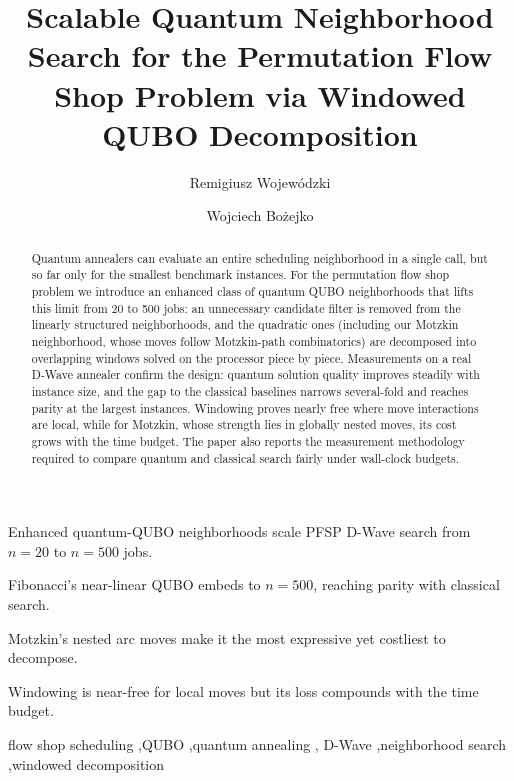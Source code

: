 \documentclass[preprint,12pt,authoryear]{elsarticle}
\begin{document}
\begin{frontmatter}

\title{Scalable Quantum Neighborhood Search for the Permutation Flow Shop
       Problem via Windowed QUBO Decomposition}

\author[pwr]{Remigiusz Wojew\'{o}dzki}

\author[pwr]{Wojciech Bo\.{z}ejko}



\begin{abstract}
Quantum annealers can evaluate an entire scheduling neighborhood in a
single call, but so far only for the smallest benchmark instances. For
the permutation flow shop problem we introduce an enhanced class of
quantum QUBO neighborhoods that lifts this limit from 20 to 500 jobs:
an unnecessary candidate filter is removed from the linearly
structured neighborhoods, and the quadratic ones (including our
Motzkin neighborhood, whose moves follow Motzkin-path combinatorics)
are decomposed into overlapping windows solved on the processor
piece by piece. Measurements on a real D-Wave annealer confirm the
design: quantum solution quality improves steadily with instance size,
and the gap to the classical baselines narrows several-fold and
reaches parity at the largest instances. Windowing proves nearly free
where move interactions are local, while for Motzkin, whose strength
lies in globally nested moves, its cost grows with the time budget. The
paper also reports the measurement methodology required to compare
quantum and classical search fairly under wall-clock budgets.
\end{abstract}

\begin{highlights}
  \item Enhanced quantum-QUBO neighborhoods scale PFSP D-Wave search from $n=20$ to $n=500$ jobs.
  \item Fibonacci's near-linear QUBO embeds to $n=500$, reaching parity with classical search.
  \item Motzkin's nested arc moves make it the most expressive yet costliest to decompose.
  \item Windowing is near-free for local moves but its loss compounds with the time budget.
\end{highlights}

\begin{keyword}
flow shop scheduling \sep QUBO \sep quantum annealing \sep
D-Wave \sep neighborhood search \sep windowed decomposition
\end{keyword}

\end{frontmatter}
\end{document}
